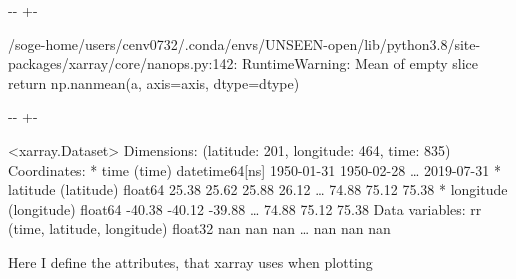 \documentclass[letterpaper,10pt,english]{sphinxmanual}
\newlength\nbsphinxcodecellspacing
\begin{document}
{

\kern-\sphinxverbatimsmallskipamount\kern-\baselineskip
\kern+\FrameHeightAdjust\kern-\fboxrule
\vspace{\nbsphinxcodecellspacing}

\begin{sphinxVerbatim}[commandchars=\\\{\}]
/soge-home/users/cenv0732/.conda/envs/UNSEEN-open/lib/python3.8/site-packages/xarray/core/nanops.py:142: RuntimeWarning: Mean of empty slice
  return np.nanmean(a, axis=axis, dtype=dtype)
\end{sphinxVerbatim}
}

{

\kern-\sphinxverbatimsmallskipamount\kern-\baselineskip
\kern+\FrameHeightAdjust\kern-\fboxrule
\vspace{\nbsphinxcodecellspacing}

\begin{sphinxVerbatim}[commandchars=\\\{\}]
\llap{\color{nbsphinxout}[4]:\,\hspace{\fboxrule}\hspace{\fboxsep}}<xarray.Dataset>
Dimensions:    (latitude: 201, longitude: 464, time: 835)
Coordinates:
  * time       (time) datetime64[ns] 1950-01-31 1950-02-28 {\ldots} 2019-07-31
  * latitude   (latitude) float64 25.38 25.62 25.88 26.12 {\ldots} 74.88 75.12 75.38
  * longitude  (longitude) float64 -40.38 -40.12 -39.88 {\ldots} 74.88 75.12 75.38
Data variables:
    rr         (time, latitude, longitude) float32 nan nan nan {\ldots} nan nan nan
\end{sphinxVerbatim}
}

Here I define the attributes, that xarray uses when plotting
\end{document}
